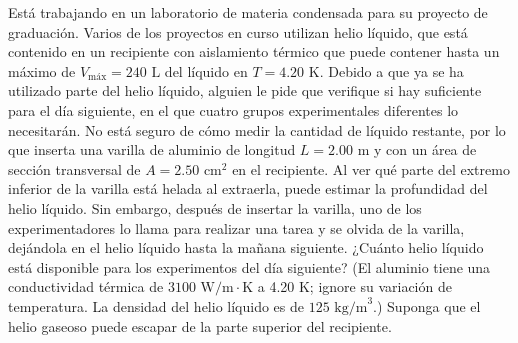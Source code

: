 \item Está trabajando en un laboratorio de materia condensada para su proyecto de graduación. Varios de los proyectos en curso utilizan helio líquido, que está contenido en un recipiente con aislamiento térmico que puede contener hasta un máximo de $V_{\text{máx}} = 240\text{ L}$ del líquido en $T = 4.20\text{ K}$. Debido a que ya se ha utilizado parte del helio líquido, alguien le pide que verifique si hay suficiente para el día siguiente, en el que cuatro grupos experimentales diferentes lo necesitarán. No está seguro de cómo medir la cantidad de líquido restante, por lo que inserta una varilla de aluminio de longitud $L = 2.00\text{ m}$ y con un área de sección transversal de $A = 2.50\text{ cm}^2$ en el recipiente. Al ver qué parte del extremo inferior de la varilla está helada al extraerla, puede estimar la profundidad del helio líquido. Sin embargo, después de insertar la varilla, uno de los experimentadores lo llama para realizar una tarea y se olvida de la varilla, dejándola en el helio líquido hasta la mañana siguiente. ¿Cuánto helio líquido está disponible para los experimentos del día siguiente? (El aluminio tiene una conductividad térmica de $3100\text{ W/m}\cdot\text{K}$ a 4.20 K; ignore su variación de temperatura. La densidad del helio líquido es de $125\text{ kg/m}^3$.) Suponga que el helio gaseoso puede escapar de la parte superior del recipiente.
